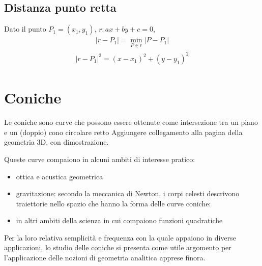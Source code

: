 \documentclass[letterpaper,10pt,english]{jupyterBook}
\begin{document}
\subsection{Distanza punto retta}
\label{\detokenize{ch/analytic_geometry/analytic_geometry_2d/lines:distanza-punto-retta}}
\sphinxAtStartPar
Dato il punto \(P_1 = (x_1, y_1)\), \(r: a x + b y + c = 0\),
\begin{equation*}
\begin{split}|r - P_1| = \min_{P \in r} |P - P_1|\end{split}
\end{equation*}\begin{equation*}
\begin{split}\begin{aligned}
|r - P_1|^2 = ( x - x_1 )^2 + ( y - y_1 )^2 
\end{aligned}\end{split}
\end{equation*}
\sphinxstepscope


\section{Coniche}
\label{\detokenize{ch/analytic_geometry/analytic_geometry_2d/conics:coniche}}\label{\detokenize{ch/analytic_geometry/analytic_geometry_2d/conics:geometry-analytic-2d-conics}}\label{\detokenize{ch/analytic_geometry/analytic_geometry_2d/conics::doc}}
\sphinxAtStartPar
Le coniche sono curve che possono essere ottenute come intersezione tra un piano e un (doppio) cono circolare retto  Aggiungere collegamento alla pagina della geometria 3D, con dimostrazione.

\sphinxAtStartPar
Queste curve compaiono in alcuni ambiti di interesse pratico:
\begin{itemize}
\item {} 
\sphinxAtStartPar
ottica e acustica geometrica

\item {} 
\sphinxAtStartPar
gravitazione: secondo la meccanica di Newton, i corpi celesti descrivono traiettorie nello spazio che hanno la forma delle curve coniche:

\item {} 
\sphinxAtStartPar
in altri ambiti della scienza in cui compaiono funzioni quadratiche

\end{itemize}

\sphinxAtStartPar
Per la loro relativa semplicità e frequenza con la quale appaiono in diverse applicazioni, lo studio delle coniche si presenta come utile argomento per l’applicazione delle nozioni di geometria analitica apprese finora.
\end{document}
